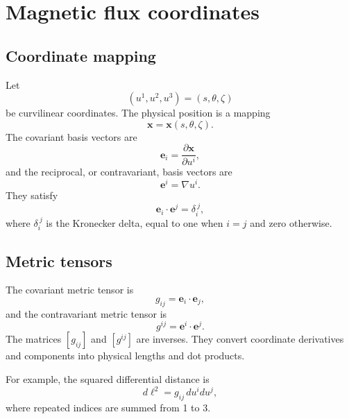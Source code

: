 \section{Magnetic flux coordinates}
\label{sec:magnetic_coordinates}

\subsection{Coordinate mapping}
Let
\begin{equation}
(u^1,u^2,u^3)=(s,\theta,\zeta)
\end{equation}
be curvilinear coordinates. The physical position is a mapping
\begin{equation}
\mathbf x=\mathbf x(s,\theta,\zeta).
\label{eq:coordinate_mapping}
\end{equation}
The covariant basis vectors are
\begin{equation}
\mathbf e_i=\frac{\partial\mathbf x}{\partial u^i},
\end{equation}
and the reciprocal, or contravariant, basis vectors are
\begin{equation}
\mathbf e^i=\nabla u^i.
\end{equation}
They satisfy
\begin{equation}
\mathbf e_i\cdot\mathbf e^j=\delta_i^{\ j},
\end{equation}
where $\delta_i^{\ j}$ is the Kronecker delta, equal to one when $i=j$ and zero otherwise.

\subsection{Metric tensors}
The covariant metric tensor is
\begin{equation}
g_{ij}=\mathbf e_i\cdot\mathbf e_j,
\label{eq:covariant_metric}
\end{equation}
and the contravariant metric tensor is
\begin{equation}
g^{ij}=\mathbf e^i\cdot\mathbf e^j.
\label{eq:contravariant_metric}
\end{equation}
The matrices $[g_{ij}]$ and $[g^{ij}]$ are inverses. They convert coordinate derivatives and components into physical lengths and dot products.

For example, the squared differential distance is
\begin{equation}
d\ell^2=g_{ij}\,du^i du^j,
\label{eq:line_element}
\end{equation}
where repeated indices are summed from 1 to 3.

